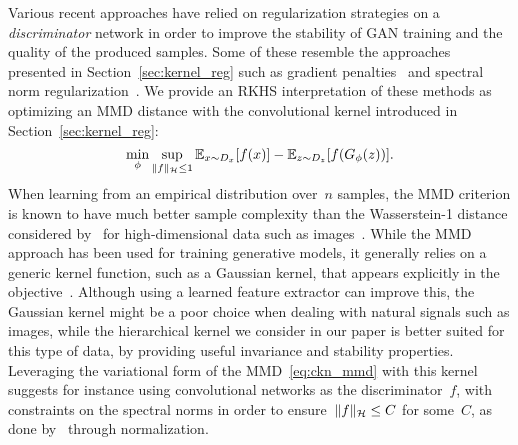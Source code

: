 Various recent approaches have relied on regularization strategies on a \emph{discriminator} network
in order to improve the stability of GAN training and the quality of the produced samples.
Some of these resemble the approaches presented in Section~\ref{sec:kernel_reg}
such as gradient penalties~\citep{gulrajani2017improved,roth2017stabilizing}
and spectral norm regularization~\citep[]{miyato2018spectral}.
We provide an RKHS interpretation of these methods as
optimizing an MMD distance with the convolutional kernel introduced in Section~\ref{sec:kernel_reg}:
\begin{equation}
\label{eq:ckn_mmd}
\min_\phi \sup_{\|f\|_{\mathcal H} \leq 1} \operatorname{\mathbb{E}}_{x \sim D_x}[ f(x)] - \operatorname{\mathbb{E}}_{z \sim D_z}[f(G_\phi(z))].
\end{equation}
When learning from an empirical distribution over~$n$ samples,
the MMD criterion is known to have much better sample complexity than the Wasserstein-1
distance considered by~\citet{arjovsky2017wasserstein} for high-dimensional data
such as images~\citep{sriperumbudur2012empirical}.
While the MMD approach has been used for training generative models, it generally relies on a generic kernel function,
such as a Gaussian kernel, that appears explicitly in the objective~\citep{dziugaite2015training,li2017mmd,binkowski2018demystifying}.
Although using a learned feature extractor can improve this, the Gaussian kernel might be a poor choice when
dealing with natural signals such as images, while the hierarchical kernel we consider in our paper is better suited
for this type of data, by providing useful invariance and stability properties.
Leveraging the variational form of the MMD~\eqref{eq:ckn_mmd} with this kernel suggests for instance using convolutional networks
as the discriminator~$f$, with constraints on the spectral norms in order to ensure~$\|f\|_{\mathcal H} \leq C$ for some~$C$,
as done by~\citet{miyato2018spectral} through normalization.
